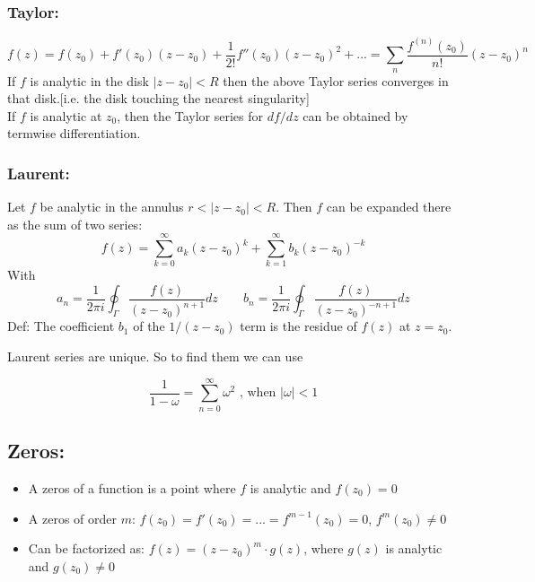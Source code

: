 \documentclass[a4paper,norsk, 10pt]{article}
\begin{document}
\subsubsection{Taylor:}
\begin{equation}
f(z) = f(z_0) + f'(z_0)(z-z_0) + \frac{1}{2!}f''(z_0)(z-z_0)^2 + ... = \sum_n \frac{f^{(n)}(z_0)}{n!}(z-z_0)^n
\end{equation}
If $f$ is analytic in the disk $|z - z_0|<R$ then the above Taylor series converges in that disk.[i.e. the disk touching the nearest singularity]\\

If $f$ is analytic at $z_0$, then the Taylor series for $df/dz$ can be obtained by termwise differentiation.

\subsubsection{Laurent:}
Let $f$ be analytic in the annulus $r < |z-z_0| < R$. Then $f$ can be expanded there as the sum of two series:
\begin{equation}
f(z) = \sum_{k=0}^{\infty} a_k(z-z_0)^k +\sum_{k=1}^{\infty} b_k(z-z_0)^{-k} 
\end{equation}
With
\begin{equation}
a_n = \frac{1}{2\pi i}\oint_{\Gamma}\frac{f(z)}{(z-z_0)^{n+1}}dz\qquad b_n = \frac{1}{2\pi i}\oint_{\Gamma}\frac{f(z)}{(z-z_0)^{-n+1}}dz
\end{equation}
Def: The coefficient $b_1$ of the $1/(z-z_0)$ term is the residue of $f(z)$ at $z = z_0$.

Laurent series are unique. So to find them we can use

\begin{equation}
\frac{1}{1-\omega} = \sum_{n=0}^{\infty}\omega^2 \text{ , when } |\omega|<1
\end{equation}

\subsection{Zeros:}
\begin{itemize}
\item A zeros of a function is a point where $f$ is analytic and $f(z_0) = 0$
\item A zeros of order $m$: $f(z_0) = f'(z_0) = ...= f^{m-1}(z_0) = 0$, $f^m(z_0) \neq 0$
\item Can be factorized as: $f(z) = (z-z_0)^m \cdot g(z)$, where $g(z)$ is analytic and $g(z_0) \neq 0$
\end{itemize}
\end{document}

